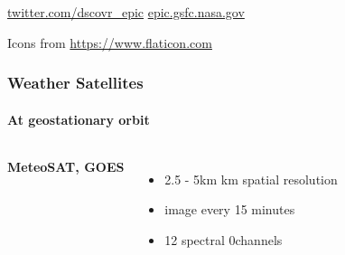 {\begin{frame}
\begin{columns}

\end{columns}

\url{twitter.com/dscovr_epic}
\url{epic.gsfc.nasa.gov}

\hfill
\vfill
\scriptsize Icons from \url{https://www.flaticon.com}
 \end{frame}

\begin{frame}
\frametitle{Weather Satellites}
\framesubtitle{At geostationary orbit}


\begin{columns}
	
	\hspace{2em}\textbf{MeteoSAT, GOES}
	\begin{itemize}
		\item 2.5 - 5km km spatial resolution
		\item image every 15 minutes
		\item 12 spectral 0channels
	\end{itemize}
	
	
\end{columns}
\end{frame}}
